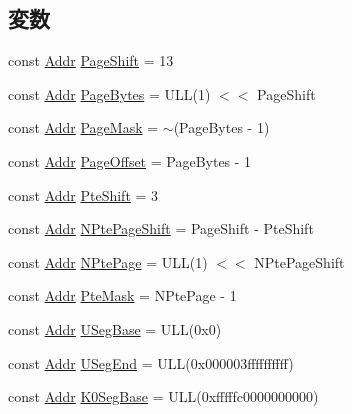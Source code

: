 \subsection*{変数}
\begin{DoxyCompactItemize}
\item 
const \hyperlink{base_2types_8hh_af1bb03d6a4ee096394a6749f0a169232}{Addr} \hyperlink{namespaceAlphaISA_a6eacddc1d6d191380d9afdac5920ea48}{PageShift} = 13
\item 
const \hyperlink{base_2types_8hh_af1bb03d6a4ee096394a6749f0a169232}{Addr} \hyperlink{namespaceAlphaISA_ad9d6a4d965e107c9a7214f096107296b}{PageBytes} = ULL(1) $<$$<$ PageShift
\item 
const \hyperlink{base_2types_8hh_af1bb03d6a4ee096394a6749f0a169232}{Addr} \hyperlink{namespaceAlphaISA_acd1e88c82c4d48223a490f4d235ced74}{PageMask} = $\sim$(PageBytes -\/ 1)
\item 
const \hyperlink{base_2types_8hh_af1bb03d6a4ee096394a6749f0a169232}{Addr} \hyperlink{namespaceAlphaISA_a51e1064f1269394dc26702651be5061f}{PageOffset} = PageBytes -\/ 1
\item 
const \hyperlink{base_2types_8hh_af1bb03d6a4ee096394a6749f0a169232}{Addr} \hyperlink{namespaceAlphaISA_af2c06ba3a5eb15cdac25d21b735b7161}{PteShift} = 3
\item 
const \hyperlink{base_2types_8hh_af1bb03d6a4ee096394a6749f0a169232}{Addr} \hyperlink{namespaceAlphaISA_a9f060ccda225dfb28dff712695adab46}{NPtePageShift} = PageShift -\/ PteShift
\item 
const \hyperlink{base_2types_8hh_af1bb03d6a4ee096394a6749f0a169232}{Addr} \hyperlink{namespaceAlphaISA_ae295358052b4e754e08cd5cd763c212a}{NPtePage} = ULL(1) $<$$<$ NPtePageShift
\item 
const \hyperlink{base_2types_8hh_af1bb03d6a4ee096394a6749f0a169232}{Addr} \hyperlink{namespaceAlphaISA_a11ac2316fa90081132b648e36e4dd11b}{PteMask} = NPtePage -\/ 1
\item 
const \hyperlink{base_2types_8hh_af1bb03d6a4ee096394a6749f0a169232}{Addr} \hyperlink{namespaceAlphaISA_a9d54e751f7acdb2ea3b820539047d085}{USegBase} = ULL(0x0)
\item 
const \hyperlink{base_2types_8hh_af1bb03d6a4ee096394a6749f0a169232}{Addr} \hyperlink{namespaceAlphaISA_a42b44a1d23d813c474aef63cd9c7a729}{USegEnd} = ULL(0x000003ffffffffff)
\item 
const \hyperlink{base_2types_8hh_af1bb03d6a4ee096394a6749f0a169232}{Addr} \hyperlink{namespaceAlphaISA_addb273bca2a259dc76f478f53b61ff11}{K0SegBase} = ULL(0xfffffc0000000000)

\end{DoxyCompactItemize}
